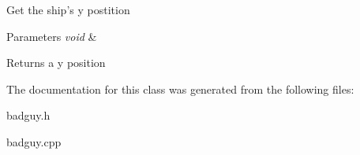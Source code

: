 Get the ship's y postition 
\begin{DoxyParams}{Parameters}
{\em void} & \\
\hline
\end{DoxyParams}
\begin{DoxyReturn}{Returns}
a y position 
\end{DoxyReturn}


The documentation for this class was generated from the following files\-:\begin{DoxyCompactItemize}
\item 
badguy.\-h\item 
badguy.\-cpp\end{DoxyCompactItemize}
